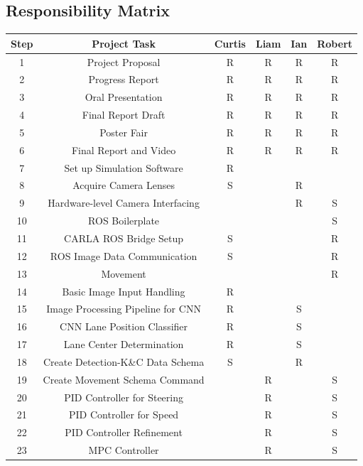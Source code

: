 \documentclass[titlepage]{article}
\begin{document}
\subsection{Responsibility Matrix}
\begin{center}
	\begin{tabular}{|c | c | c | c | c | c |} 
	 \hline
	 Step & Project Task & Curtis & Liam & Ian & Robert \\ [0.5ex] 
	 \hline
	 1 & Project Proposal & R & R & R & R \\ 
	 \hline
	 2 & Progress Report & R & R & R & R \\ 
	 \hline
	 3 & Oral Presentation & R & R & R & R \\ 
	 \hline
	 4 & Final Report Draft & R & R & R & R \\
	 \hline
	 5 & Poster Fair & R & R & R & R \\ 
	 \hline
	 6 & Final Report and Video & R & R & R & R \\ 
	 \hline
	 7 & Set up Simulation Software & R &  &  &  \\ 
	 \hline
	 8 & Acquire Camera Lenses & S &  & R  &  \\ 
	 \hline
	 9 & Hardware-level Camera Interfacing &  &  & R & S \\ 
	 \hline
	 10 & ROS Boilerplate &  &  &  & S \\ 
	 \hline
	 11 & CARLA ROS Bridge Setup & S &  &  & R \\ 
	 \hline
	 12 & ROS Image Data Communication & S &  &  & R \\ 
	 \hline
	 13 & Movement &  &  &  & R \\ 
	 \hline
	 14 & Basic Image Input Handling & R &  &  &  \\ 
	 \hline
	 15 & Image Processing Pipeline for CNN & R &  & S &  \\ 
	 \hline
	 16 & CNN Lane Position Classifier & R &  & S &  \\ 
	 \hline
	 17 & Lane Center Determination & R &  & S &  \\ 
	 \hline
	 18 & Create Detection-K\&C Data Schema & S &  & R &  \\ 
	 \hline
	 19 & Create Movement Schema Command &  & R &  & S \\ 
	 \hline
	 20 & PID Controller for Steering &  & R &  & S \\ 
	 \hline
	 21 & PID Controller for Speed &  & R &  & S \\ 
	 \hline
	 22 & PID Controller Refinement  &  & R &  & S \\ 
	 \hline
	 23 & MPC Controller &  & R &  & S \\ 
	 \hline
	\end{tabular}
	\end{center}
	
\end{document}

